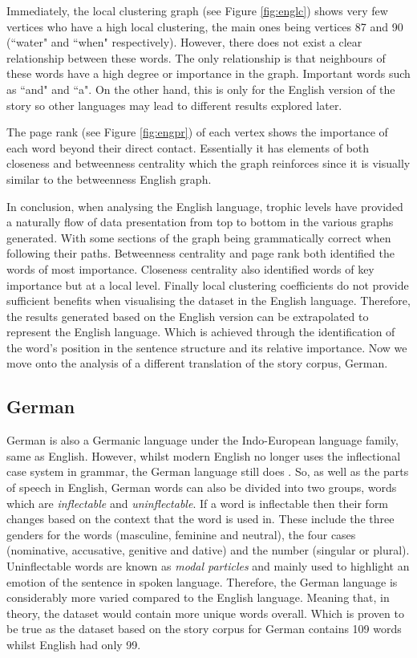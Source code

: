Immediately, the local clustering graph (see Figure \ref{fig:englc}) shows very few vertices who have a high local clustering, the main ones being vertices 87 and 90 (``water" and ``when" respectively). However, there does not exist a clear relationship between these words. The only relationship is that neighbours of these words have a high degree or importance in the graph. Important words such as ``and" and ``a". On the other hand, this is only for the English version of the story so other languages may lead to different results explored later. 

The page rank (see Figure \ref{fig:engpr}) of each vertex shows the importance of each word beyond their direct contact. Essentially it has elements of both closeness and betweenness centrality which the graph reinforces since it is visually similar to the betweenness English graph.

In conclusion, when analysing the English language, trophic levels have provided a naturally flow of data presentation from top to bottom in the various graphs generated. With some sections of the graph being grammatically correct when following their paths. Betweenness centrality and page rank both identified the words of most importance. Closeness centrality also identified words of key importance but at a local level. Finally local clustering coefficients do not provide sufficient benefits when visualising the dataset in the English language. Therefore, the results generated based on the English version can be extrapolated to represent the English language. Which is achieved through the identification of the word's position in the sentence structure and its relative importance. Now we move onto the analysis of a different translation of the story corpus, German.

\subsection{German}
German is also a Germanic language under the Indo-European language family, same as English. However, whilst modern English no longer uses the inflectional case system in grammar, the German language still does \cite{durrell2011hammer}. So, as well as the parts of speech in English, German words can also be divided into two groups, words which are \emph{inflectable} and \emph{uninflectable}. If a word is inflectable then their form changes based on the context that the word is used in. These include the three genders for the words (masculine, feminine and neutral), the four cases (nominative, accusative, genitive and dative) and the number (singular or plural). Uninflectable words are known as \emph{modal particles} and mainly used to highlight an emotion of the sentence in spoken language. Therefore, the German language is considerably more varied compared to the English language. Meaning that, in theory, the dataset would contain more unique words overall. Which is proven to be true as the dataset based on the story corpus for German contains 109 words whilst English had only 99.

